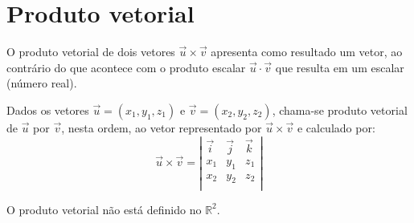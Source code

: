 \chapter{Produto vetorial}

O produto vetorial de dois vetores $\vec{u}\times \vec{v}$ apresenta como resultado um vetor, ao contrário do que acontece com o produto escalar $\vec{u}\cdot \vec{v}$ que resulta em um escalar (número real).

\begin{df} Dados os vetores $\vec{u}=(x_1, y_1, z_1)$ e $\vec{v}=(x_2, y_2, z_2)$, chama-se produto vetorial de $\vec{u}$ por $\vec{v}$, nesta ordem, ao vetor representado por $\vec{u}\times \vec{v}$ e calculado por:$$\vec{u}\times \vec{v}= \left|
\begin{array}{ccc}
\vec i & \vec j & \vec k \\
x_1 & y_1 & z_1 \\
x_2 & y_2 & z_2 \\
\end{array}
\right|$$

O produto vetorial não está definido no $\mathbb{R}^2$.
\end{df} 

